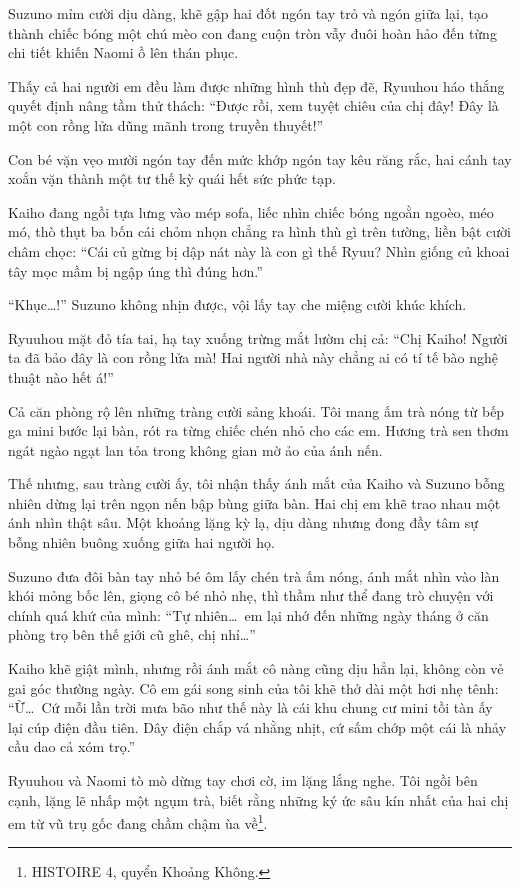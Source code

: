 \documentclass[../main.tex]{subfiles}
\begin{document}
Suzuno mỉm cười dịu dàng, khẽ gập hai đốt ngón tay trỏ và ngón giữa lại, tạo thành chiếc bóng một chú mèo con đang cuộn tròn vẫy đuôi hoàn hảo đến từng chi tiết khiến Naomi ồ lên thán phục.

Thấy cả hai người em đều làm được những hình thù đẹp đẽ, Ryuuhou háo thắng quyết định nâng tầm thử thách: ``Được rồi, xem tuyệt chiêu của chị đây! Đây là một con rồng lửa dũng mãnh trong truyền thuyết!''

Con bé vặn vẹo mười ngón tay đến mức khớp ngón tay kêu răng rắc, hai cánh tay xoắn vặn thành một tư thế kỳ quái hết sức phức tạp.

Kaiho đang ngồi tựa lưng vào mép sofa, liếc nhìn chiếc bóng ngoằn ngoèo, méo mó, thò thụt ba bốn cái chỏm nhọn chẳng ra hình thù gì trên tường, liền bật cười châm chọc: ``Cái củ gừng bị dập nát này là con gì thế Ryuu? Nhìn giống củ khoai tây mọc mầm bị ngập úng thì đúng hơn.''

``Khục\dots!'' Suzuno không nhịn được, vội lấy tay che miệng cười khúc khích.

Ryuuhou mặt đỏ tía tai, hạ tay xuống trừng mắt lườm chị cả: ``Chị Kaiho! Người ta đã bảo đây là con rồng lửa mà! Hai người nhà này chẳng ai có tí tế bào nghệ thuật nào hết á!''

Cả căn phòng rộ lên những tràng cười sảng khoái. Tôi mang ấm trà nóng từ bếp ga mini bước lại bàn, rót ra từng chiếc chén nhỏ cho các em. Hương trà sen thơm ngát ngào ngạt lan tỏa trong không gian mờ ảo của ánh nến.

Thế nhưng, sau tràng cười ấy, tôi nhận thấy ánh mắt của Kaiho và Suzuno bỗng nhiên dừng lại trên ngọn nến bập bùng giữa bàn. Hai chị em khẽ trao nhau một ánh nhìn thật sâu. Một khoảng lặng kỳ lạ, dịu dàng nhưng đong đầy tâm sự bỗng nhiên buông xuống giữa hai người họ.

Suzuno đưa đôi bàn tay nhỏ bé ôm lấy chén trà ấm nóng, ánh mắt nhìn vào làn khói mỏng bốc lên, giọng cô bé nhỏ nhẹ, thì thầm như thể đang trò chuyện với chính quá khứ của mình: ``Tự nhiên\dots\ em lại nhớ đến những ngày tháng ở căn phòng trọ bên thế giới cũ ghê, chị nhỉ\dots''

Kaiho khẽ giật mình, nhưng rồi ánh mắt cô nàng cũng dịu hẳn lại, không còn vẻ gai góc thường ngày. Cô em gái song sinh của tôi khẽ thở dài một hơi nhẹ tênh: ``Ừ\dots\ Cứ mỗi lần trời mưa bão như thế này là cái khu chung cư mini tồi tàn ấy lại cúp điện đầu tiên. Dây điện chắp vá nhằng nhịt, cứ sấm chớp một cái là nhảy cầu dao cả xóm trọ.''

Ryuuhou và Naomi tò mò dừng tay chơi cờ, im lặng lắng nghe. Tôi ngồi bên cạnh, lặng lẽ nhấp một ngụm trà, biết rằng những ký ức sâu kín nhất của hai chị em từ vũ trụ gốc đang chầm chậm ùa về\footnote{{\dawnland HISTOIRE 4}, quyển Khoảng Không.}.
\end{document}
